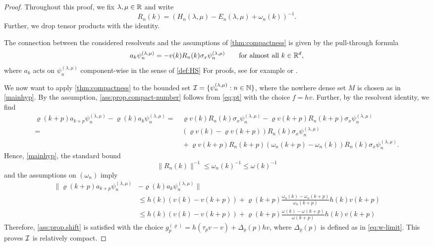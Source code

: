 \documentclass[a4paper,12pt,oneside]{article}
\newcommand{\pln}{\psi_n^{(\lambda,\mu)}}
\begin{document}
\begin{proof}
	Throughout this proof, we fix $\lambda,\mu\in{\mathbb R}$ and write
	\[ R_n(k) =  (H_n(\lambda,\mu)-E_n(\lambda,\mu)+\omega_n(k))^{-1}.\]
	Further, we drop tensor products with the identity.
	
	The connection between the considered resolvents and the assumptions of \cref{thm:compactness} is given by the pull-through formula
	\begin{equation}\label{eq:pt}
		a_k\psi_n^{(\lambda,\mu)} = -v(k)R_n(k)\sigma_x \psi_n^{(\lambda,\mu)} \qquad\mbox{for almost all}\ k\in{\mathbb R}^d,
	\end{equation}
	where $a_k$ acts on $\pln$ component-wise in the sense of \cref{def:HS}
	For proofs, see for example \cite{BachFroehlichSigal.1998b,Gerard.2000} or \cite[Lemma 6.13]{Hinrichs.2022}.
	
	We now want to apply \cref{thm:compactness} to the bounded set ${\mathcal I}=\{\psi_n^{(\lambda,\mu)}:n\in{\mathbb N}\}$, where the nowhere dense set $M$ is chosen as in \cref{mainhyp}.
	By the assumption, \cref{ass:prop.compact-number} follows from \cref{eq:pt} with the choice $f=hv$. Further, by the resolvent identity, we find
	\begin{align*}
		\varrho(k+p)a_{k+p}\pln - \varrho(k)a_k\pln  = &\, \varrho v(k)R_n(k)\sigma_x\pln - \varrho v(k+p)R_n(k+p)\sigma_x\pln\\
		= &\, (\varrho v (k) - \varrho v(k+p))R_n(k)\sigma_x \pln \\ &\, + \varrho v(k+p)R_n(k+p)(\omega_n(k+p)-\omega_n(k))R_n(k)\sigma_x\pln.
	\end{align*}
	Hence, \cref{mainhyp}, the standard bound
	\begin{equation}\label{eq:standard}
		\|R_n(k)\|^{-1}\le \omega_n(k)^{-1} \le \omega(k)^{-1}
	\end{equation}
	and the assumptions on $(\omega_n)$ imply
	\begin{align*}
		\|\varrho(k+p)a_{k+p}\pln &- \varrho(k)a_k\pln\|\\& \le h(k)(v(k)-v(k+p)) + \varrho(k+p)\frac{\omega_n(k)-\omega_n(k+p)}{\omega_n(k+p)} h(k)v(k+p)\\
		& \le h(k)(v(k)-v(k+p)) + \varrho(k+p)\frac{\omega(k)-\omega(k+p)}{\omega(k+p)} h(k)v(k+p)
	\end{align*}
	Therefore, \cref{ass:prop.shift} is satisfied with the choice $g^{(\varrho)}_{p} = h(\tau_pv-v) + \Delta_\varrho(p)hv$, where $\Delta_\varrho(p)$ is defined as in \cref{eq:w-limit}. This proves ${\mathcal I}$ is relatively compact.


\end{proof}
\end{document}
